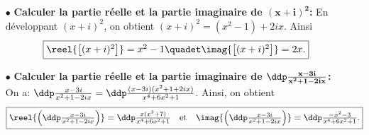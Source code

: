 
\begin{correction}   \;
\begin{itemize}
\item[$\bullet$] \textbf{Calculer la partie r\'eelle et la partie imaginaire de $\mathbf{(x+i)^2}$:}
En d\'eveloppant $(x+i)^2$, on obtient $(x+i)^2=(x^2-1)+2i x$. Ainsi
$$\fbox{$\reel{\left\lbrack(x+i)^2\right\rbrack}=x^2-1\quadet \imag{\left\lbrack(x+i)^2\right\rbrack}=2x.$}$$
\item[$\bullet$]  \textbf{Calculer la partie r\'eelle et la partie imaginaire de $\mathbf{\ddp\frac{x-3i}{x^2+1-2i x}}$:}
On a: $\ddp\frac{x-3i}{x^2+1-2i x}=\ddp\frac{(x-3i)(x^2+1+2i x)}{x^4+6x^2+1}$.
Ainsi, on obtient
$$\fbox{$\reel{ \left(\ddp\frac{x-3i}{x^2+1-2i x}\right)}=\ddp\frac{x(x^2+7)}{x^4+6x^2+1}\quad\hbox{et}\quad \imag{\left(\ddp\frac{x-3i}{x^2+1-2i x}\right)}=\ddp\frac{-x^2-3}{x^4+6x^2+1}.$}$$
\end{itemize}
\end{correction}
